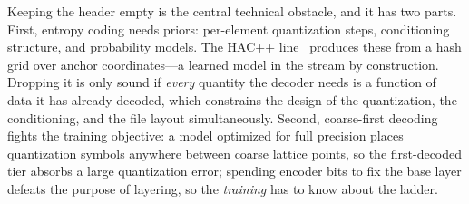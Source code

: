 Keeping the header empty is the central technical obstacle, and it has two parts.
First, entropy coding needs priors: per-element quantization steps, conditioning structure, and probability models.
The HAC++ line~\cite{chen2024,chen2025} produces these from a hash grid over anchor coordinates---a learned model in the stream by construction.
Dropping it is only sound if \emph{every} quantity the decoder needs is a function of data it has already decoded, which constrains the design of the quantization, the conditioning, and the file layout simultaneously.
Second, coarse-first decoding fights the training objective: a model optimized for full precision places quantization symbols anywhere between coarse lattice points, so the first-decoded tier absorbs a large quantization error; spending encoder bits to fix the base layer defeats the purpose of layering, so the \emph{training} has to know about the ladder.

